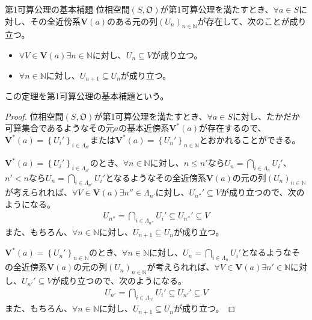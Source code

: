 \documentclass[dvipdfmx]{jsarticle}
\begin{document}
\begin{thm}{第1可算公理の基本補題}\label{8.1.2.17}
位相空間$\left( S,\mathfrak{O} \right)$が第1可算公理を満たすとき、$\forall a \in S$に対し、その全近傍系$\mathbf{V}(a)$のある元の列$\left( U_{n} \right)_{n \in \mathbb{N}}$が存在して、次のことが成り立つ。
\begin{itemize}
\item
  $\forall V \in \mathbf{V}(a)\exists n \in \mathbb{N}$に対し、$U_{n} \subseteq V$が成り立つ。
\item
  $\forall n \in \mathbb{N}$に対し、$U_{n + 1} \subseteq U_{n}$が成り立つ。
\end{itemize}
この定理を第1可算公理の基本補題という。
\end{thm}
\begin{proof}
位相空間$\left( S,\mathfrak{O} \right)$が第1可算公理を満たすとき、$\forall a \in S$に対し、たかだか可算集合であるようなその元$a$の基本近傍系$\mathbf{V}^{*}(a)$が存在するので、$\mathbf{V}^{*}(a) = \left\{ U_{i}' \right\}_{i \in \varLambda_{n'}}$または$\mathbf{V}^{*}(a) = \left\{ U_{n}' \right\}_{n \in \mathbb{N}}$とおかれることができる。\par
$\mathbf{V}^{*}(a) = \left\{ U_{i}' \right\}_{i \in \varLambda_{n'}}$のとき、$\forall n \in \mathbb{N}$に対し、$n \leq n'$なら$U_{n} = \bigcap_{i \in \varLambda_{n}} U_{i}'$、$n' < n$なら$U_{n} = \bigcap_{i \in \varLambda_{n'}} U_{i}'$となるようなその全近傍系$\mathbf{V}(a)$の元の列$\left( U_{n} \right)_{n \in \mathbb{N}}$が考えられれば、$\forall V \in \mathbf{V}(a)\exists n'' \in \varLambda_{n'}$に対し、$U_{n''}' \subseteq V$が成り立つので、次のようになる。
\begin{align*}
U_{n''} = \bigcap_{i \in \varLambda_{n''}} U_{i}' \subseteq U_{n''}' \subseteq V
\end{align*}
また、もちろん、$\forall n \in \mathbb{N}$に対し、$U_{n + 1} \subseteq U_{n}$が成り立つ。\par
$\mathbf{V}^{*}(a) = \left\{ U_{n}' \right\}_{n \in \mathbb{N}}$のとき、$\forall n \in \mathbb{N}$に対し、$U_{n} = \bigcap_{i \in \varLambda_{n}} U_{i}'$となるようなその全近傍系$\mathbf{V}(a)$の元の列$\left( U_{n} \right)_{n \in \mathbb{N}}$が考えられれば、$\forall V \in \mathbf{V}(a)\exists n' \in \mathbb{N}$に対し、$U_{n'}' \subseteq V$が成り立つので、次のようになる。
\begin{align*}
U_{n'} = \bigcap_{i \in \varLambda_{n'}} U_{i}' \subseteq U_{n'}' \subseteq V
\end{align*}
また、もちろん、$\forall n \in \mathbb{N}$に対し、$U_{n + 1} \subseteq U_{n}$が成り立つ。
\end{proof}
\end{document}
